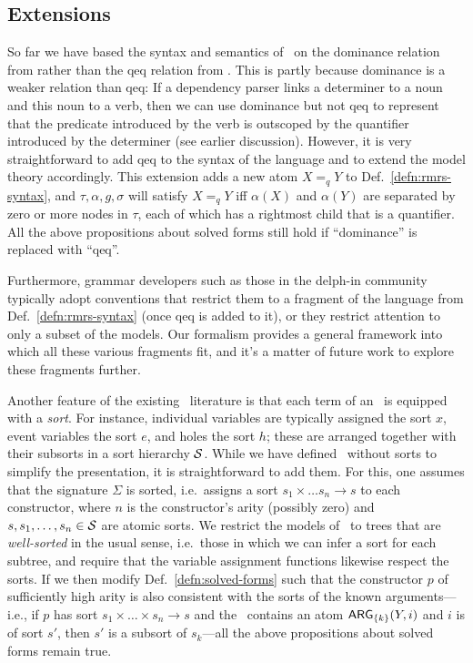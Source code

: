 \subsection{Extensions}
\label{sec:extensions}

So far we have based the syntax and semantics of \rmrs\ on the
dominance relation from  rather than the qeq
relation from .  This is partly because
dominance is a weaker relation than qeq: If a dependency parser links
a determiner to a noun and this noun to a verb, then we can use
dominance but not qeq to represent that the predicate introduced by
the verb is outscoped by the quantifier introduced by the determiner
(see earlier discussion).  However, it is very straightforward to add
qeq to the syntax of the language and to extend the model theory
accordingly.  This extension adds a new atom $X=_q Y$ to
Def.~\ref{defn:rmrs-syntax}, and $\tau,\alpha,g,\sigma$ will satisfy
$X=_q Y$ iff $\alpha(X)$ and $\alpha(Y)$ are separated by zero or more
nodes in $\tau$, each of which has a rightmost child that is a
quantifier. All the above propositions about solved forms still hold
if ``dominance'' is replaced with ``qeq''.

Furthermore, grammar developers such as those in the {\sc delph-in}
community typically adopt conventions that restrict them to a fragment
of the language from Def.~\ref{defn:rmrs-syntax} (once qeq is added to
it), or they restrict attention to only a subset of the models.
Our formalism provides a
general framework into which all these various fragments fit, and it's
a matter of future work to explore these fragments further.

Another feature of the existing \rmrs\ literature is that each term of
an \rmrs\ is equipped with a \emph{sort}.  For instance, individual
variables are typically assigned the sort $x$, event variables the
sort $e$, and holes the sort $h$; these are arranged together with
their subsorts in a sort hierarchy ${\cal S}$.  While we have defined
\rmrs\ without sorts to simplify the presentation, it is
straightforward to add them.  For this, one assumes that the signature
$\Sigma$ is sorted, i.e.\ assigns a sort $s_1\times\ldots
s_n\rightarrow s$ to each constructor, where $n$ is the constructor's
arity (possibly zero) and $s,s_1,\ldots,s_n\in {\cal S}$ are atomic
sorts.  We restrict the models of \rmrs\ to trees that are
\emph{well-sorted} in the usual sense, i.e.\ those in which we can
infer a sort for each subtree, and require that the variable
assignment functions likewise respect the sorts.  If we then modify
Def.~\ref{defn:solved-forms} such that the constructor $p$ of
sufficiently high arity is also consistent with the sorts of the known
arguments---i.e., if $p$ has sort $s_1 \times \ldots \times s_n
\rightarrow s$ and the \rmrs\ contains an atom $\mathsf{ARG}_{\{k\}}(Y,i)$ and
$i$ is of sort $s'$, then $s'$ is a subsort of $s_k$---all the above
propositions about solved forms remain true.



